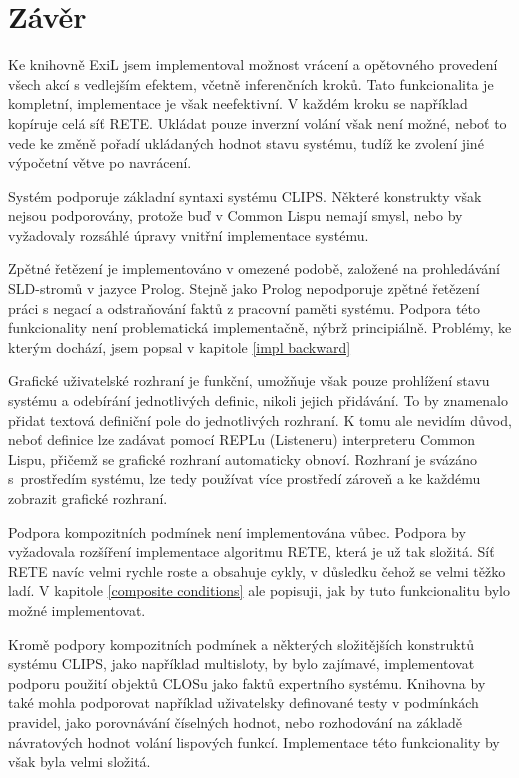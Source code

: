 \section{Závěr}

Ke knihovně ExiL jsem implementoval možnost vrácení a opětovného provedení všech
akcí s vedlejším efektem, včetně inferenčních kroků. Tato funkcionalita je
kompletní, implementace je však neefektivní. V každém kroku se například
kopíruje celá síť RETE. Ukládat pouze inverzní volání však není možné, neboť to
vede ke změně pořadí ukládaných hodnot stavu systému, tudíž ke zvolení jiné
výpočetní větve po navrácení.

Systém podporuje základní syntaxi systému CLIPS. Některé konstrukty však nejsou
podporovány, protože buď v Common Lispu nemají smysl, nebo by vyžadovaly rozsáhlé
úpravy vnitřní implementace systému.

Zpětné řetězení je implementováno v omezené podobě, založené na prohledávání
SLD-stromů v jazyce Prolog. Stejně jako Prolog nepodporuje zpětné řetězení práci
s negací a odstraňování faktů z pracovní paměti systému. Podpora této
funkcionality není problematická implementačně, nýbrž principiálně. Problémy, ke
kterým dochází, jsem popsal v kapitole \ref{impl backward}

Grafické uživatelské rozhraní je funkční, umožňuje však pouze prohlížení stavu
systému a odebírání jednotlivých definic, nikoli jejich přidávání. To by
znamenalo přidat textová definiční pole do jednotlivých rozhraní. K tomu ale
nevidím důvod, neboť definice lze zadávat pomocí REPLu (Listeneru) interpreteru
Common Lispu, přičemž se grafické rozhraní automaticky obnoví. Rozhraní je
svázáno s~prostředím systému, lze tedy používat více prostředí zároveň a ke
každému zobrazit grafické rozhraní.

Podpora kompozitních podmínek není implementována vůbec. Podpora by
vyžadovala rozšíření implementace algoritmu RETE, která je už tak složitá. Síť
RETE navíc velmi rychle roste a obsahuje cykly, v důsledku čehož se velmi těžko
ladí. V kapitole \ref{composite conditions} ale popisuji, jak by tuto
funkcionalitu bylo možné implementovat.

Kromě podpory kompozitních podmínek a některých složitějších konstruktů systému
CLIPS, jako například multisloty, by bylo zajímavé, implementovat podporu
použití objektů CLOSu jako faktů expertního systému. Knihovna by také mohla
podporovat například uživatelsky definované testy v podmínkách pravidel, jako
porovnávání číselných hodnot, nebo rozhodování na základě návratových hodnot
volání lispových funkcí. Implementace této funkcionality by však byla velmi
složitá.

